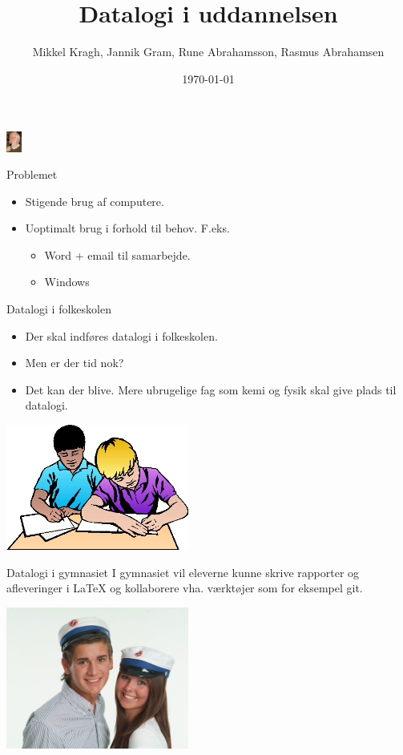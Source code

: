 \documentclass{beamer}
\title[Datalogi i uddannelsen]{Datalogi i uddannelsen}
\author{Mikkel Kragh, Jannik Gram, Rune Abrahamsson, Rasmus Abrahamsen}
\institute{DIKU}
\date{\today}
\begin{document}
\begin{frame}
\titlepage
\includegraphics[width=5mm]{Peternaur.png}
\end{frame}


\begin{frame}{Problemet}
\begin{itemize}
\item Stigende brug af computere.
\item Uoptimalt brug i forhold til behov. F.eks.
\begin{itemize}
\item Word + email til samarbejde.
\item Windows
\end{itemize}
\end{itemize}

\end{frame}

\begin{frame}{Datalogi i folkeskolen}

\begin{itemize}
\item Der skal indføres datalogi i folkeskolen.
\item Men er der tid nok?
\item Det kan der blive. Mere ubrugelige fag som kemi og fysik skal give plads til datalogi.
\end{itemize}

\includegraphics[width=60mm]{skole.png}

\end{frame}

\begin{frame}{Datalogi i gymnasiet}
I gymnasiet vil eleverne kunne skrive rapporter og afleveringer i LaTeX og kollaborere vha. værktøjer som for eksempel git.

\includegraphics[width=60mm]{gymnasie.png}

\end{frame}
\end{document}
